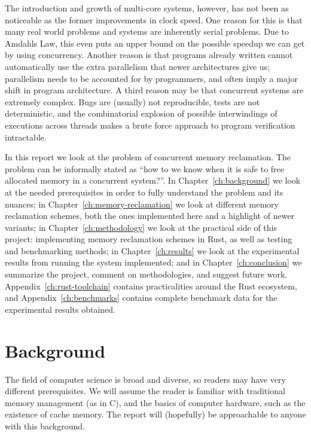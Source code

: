 \documentclass[b5paper]{report}
\begin{document}
The introduction and growth of multi-core systems, however, has not been as
noticeable as the former improvements in clock speed. One reason for this is
that many real world problems and systems are inherently serial problems. Due to
Amdahls Law, this even puts an upper bound on the possible speedup we can get by
using concurrency.  Another reason is that programs already written cannot
automatically use the extra parallelism that newer architectures give us;
parallelism needs to be accounted for by programmers, and often imply a major
shift in program architecture. A third reason may be that concurrent systems are
extremely complex. Bugs are (usually) not reproducible, tests are not
deterministic, and the combinatorial explosion of possible interwindings of
executions across threads makes a brute force approach to program verification
intractable.

In this report we look at the problem of concurrent memory reclamation. The
problem can be informally stated as ``how to we know when it is safe to free
allocated memory in a concurrent system?''. In Chapter~\ref{ch:background} we
look at the needed prerequisites in order to fully understand the problem and
its nuances; in Chapter~\ref{ch:memory-reclamation} we look at different memory
reclamation schemes, both the ones implemented here and a highlight of newer
variants; in Chapter~\ref{ch:methodology} we look at the practical side of this
project: implementing memory reclamation schemes in Rust, as well as testing and
benchmarking methods; in Chapter~\ref{ch:results} we look at the experimental
results from running the system implemented; and in Chapter~\ref{ch:conclusion}
we summarize the project, comment on methodologies, and suggest future work.
Appendix~\ref{ch:rust-toolchain} contains practicalities around the Rust
ecosystem, and Appendix~\ref{ch:benchmarks} contains complete benchmark data for
the experimental results obtained.




\chapter{Background\label{ch:background}}

The field of computer science is broad and diverse, so readers may have very
different prerequisites.  We will assume the reader is familiar with traditional
memory management (as in C), and the basics of computer hardware, such as the
existence of cache memory. The report will (hopefully) be approachable to anyone
with this background.
\end{document}
